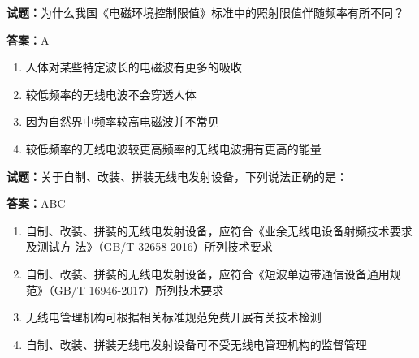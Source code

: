 \documentclass{ctexbook}
\begin{document}




\vspace{1em}

\textbf{试题：}为什么我国《电磁环境控制限值》标准中的照射限值伴随频率有所不同？ 

\textbf{答案：}A 

\begin{enumerate}[leftmargin=3em]
  \item 人体对某些特定波长的电磁波有更多的吸收 

  \item 较低频率的无线电波不会穿透人体 

  \item 因为自然界中频率较高电磁波并不常见 

  \item 较低频率的无线电波较更高频率的无线电波拥有更高的能量 

\end{enumerate}






\vspace{1em}

\textbf{试题：}关于自制、改装、拼装无线电发射设备，下列说法正确的是： 

\textbf{答案：}ABC 

\begin{enumerate}[leftmargin=3em]
  \item 自制、改装、拼装的无线电发射设备，应符合《业余无线电设备射频技术要求及测试方
法》（GB/T 32658-2016）所列技术要求 

  \item 自制、改装、拼装的无线电发射设备，应符合《短波单边带通信设备通用规范》（GB/T 
16946-2017）所列技术要求 

  \item 无线电管理机构可根据相关标准规范免费开展有关技术检测 

  \item 自制、改装、拼装无线电发射设备可不受无线电管理机构的监督管理 

\end{enumerate}





\vspace{1em}
\end{document}

